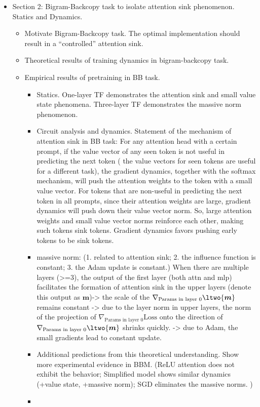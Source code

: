 \begin{itemize}
    \item Section 2: Bigram-Backcopy task to isolate attention sink phenomenon. Statics and Dynamics.
    \begin{itemize}
    \item Motivate Bigram-Backcopy task. The optimal implementation should result in a ``controlled'' attention sink.
    \item Theoretical results of training dynamics in bigram-backcopy task.
    \item Empirical results of pretraining in BB task.
    \begin{itemize}
        \item Statics. One-layer TF demonstrates the attention sink and small value state phenomena. Three-layer TF demonstrates the massive norm phenomenon. 
        \item Circuit analysis and dynamics. Statement of the mechanism of attention sink in BB task: For any attention head with a certain prompt, if the value vector of any seen token is not useful in predicting the next token ({\color{red} the value vectors for seen tokens are useful for a different task}), the gradient dynamics, together with the softmax mechanism, will push the attention weights to the token with a small value vector. For tokens that are non-useful in predicting the next token in all prompts, since their attention weights are large, gradient dynamics will push down their value vector norm. So, large attention weights and small value vector norms reinforce each other, making such tokens sink tokens. Gradient dynamics favors pushing early tokens to be sink tokens.  
        \item massive norm: (1. related to attention sink; 2. the influence function is constant; 3. the Adam update is constant.) When there are multiple layers (>=3), the output of the first layer (both attn and mlp) facilitates the formation of attention sink in the upper layers (denote this output as $\boldsymbol{m}$)-> the scale of the $\nabla_{\text{Params in layer 0}} \ltwo{\boldsymbol{m}}$ remains constant -> due to the layer norm in upper layers, the norm of the projection of $\nabla_{\text{Params in layer 0}} \text{Loss} $ onto the direction of $\nabla_{\text{Params in layer 0}} \ltwo{\boldsymbol{m}}$ shrinks quickly. -> due to Adam, the small gradients lead to constant update. 
        
        \item Additional predictions from this theoretical understanding. Show more experimental evidence in BBM. (ReLU attention does not exhibit the behavior; Simplified model shows similar dynamics (+value state, +massive norm); SGD eliminates the massive norms. )
        \item {}
    \end{itemize}
    \end{itemize}


\end{itemize}
